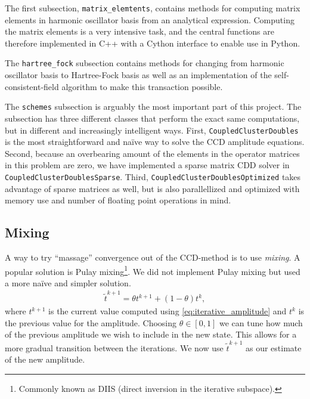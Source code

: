 \documentclass[
    a4paper, aps, twocolumn, floatfix, superscriptaddress,
    nofootinbib]{revtex4-1}
\newcommand{\1}{\mathds{1}}
\begin{document}
        \vspace{10pt}
        \vspace{10pt}

        The first subsection, \texttt{matrix_elemtents},
        contains methods for computing matrix elements in harmonic
        oscillator basis from an analytical
        expression\cite{anisimovas1998energy}.  Computing the matrix
        elements is a very intensive task, and the central functions are
        therefore implemented in C++ with a Cython interface to enable use
        in Python.

        The \texttt{hartree_fock} subsection contains methods
        for changing from harmonic oscillator basis to Hartree-Fock basis as
        well as an implementation of the self-consistent-field algorithm to
        make this transaction possible.

        The \texttt{schemes} subsection is arguably the most
        important part of this project. The subsection has three different
        classes that perform the exact same computations, but in different
        and increasingly intelligent ways. First,
        \texttt{CoupledClusterDoubles} is the most
        straightforward and naïve way to solve the CCD amplitude equations.
        Second, because an overbearing amount of the elements in the
        operator matrices in this problem are zero, we have implemented a
        sparse matrix CDD solver in
        \texttt{CoupledClusterDoublesSparse}. Third,
        \texttt{CoupledClusterDoublesOptimized} takes advantage
        of sparse matrices as well, but is also parallellized and optimized
        with memory use and number of floating point operations in mind.

    \subsection{Mixing}
        A way to try ``massage'' convergence out of the CCD-method is to use
        \emph{mixing}. A popular solution is Pulay mixing\footnote{Commonly
        known as DIIS (direct inversion in the iterative subspace).}. We did not
        implement Pulay mixing but used a more naïve and simpler solution.
        \begin{align}
            \tilde{t}^{k + 1} = \theta t^{k + 1} + (1 - \theta)t^k,
        \end{align}
        where $t^{k + 1}$ is the current value computed using
        \autoref{eq:iterative_amplitude} and $t^k$ is the previous value for the
        amplitude. Choosing $\theta \in [0, 1]$ we can tune how much of the
        previous amplitude we wish to include in the new state. This allows for
        a more gradual transition between the iterations. We now use
        $\tilde{t}^{k + 1}$ as our estimate of the new amplitude.
\end{document}
